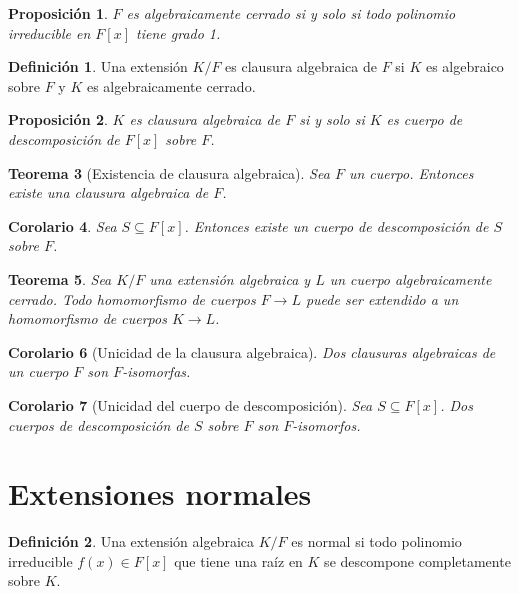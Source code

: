 \documentclass{report}
\newtheorem{theorem}{Teorema}[chapter]
\newtheorem{corollary}[theorem]{Corolario}
\newtheorem{proposition}[theorem]{Proposición}
\theoremstyle{remark}
\theoremstyle{definition}
\newtheorem{definition}{Definición}[chapter]
\theoremstyle{definition}
\theoremstyle{definition}
\begin{document}
\begin{proposition}
    $F$ es algebraicamente cerrado si y solo si todo polinomio irreducible en $F[x]$ tiene grado 1.
\end{proposition}

\begin{definition}
    Una extensión $K/F$ es clausura algebraica de $F$ si $K$ es algebraico sobre $F$ y $K$ es algebraicamente cerrado.
\end{definition}

\begin{proposition}
    $K$ es clausura algebraica de $F$ si y solo si $K$ es cuerpo de descomposición de $F[x]$ sobre $F$.
\end{proposition}

\begin{theorem}[Existencia de clausura algebraica]
    Sea $F$ un cuerpo. Entonces existe una clausura algebraica de $F$.
\end{theorem}

\begin{corollary}
    Sea $S \subseteq F[x]$. Entonces existe un cuerpo de descomposición de $S$ sobre $F$.
\end{corollary}

\begin{theorem}
    Sea $K/F$ una extensión algebraica y $L$ un cuerpo algebraicamente cerrado.
    Todo homomorfismo de cuerpos $F \to L$ puede ser extendido a un homomorfismo de cuerpos $K \to L$.
\end{theorem}

\begin{corollary}[Unicidad de la clausura algebraica]
    Dos clausuras algebraicas de un cuerpo $F$ son $F$-isomorfas.
\end{corollary}

\begin{corollary}[Unicidad del cuerpo de descomposición]
    Sea $S \subseteq F[x]$. Dos cuerpos de descomposición de $S$ sobre $F$ son $F$-isomorfos.
\end{corollary}

\section{Extensiones normales}

\begin{definition}
    Una extensión algebraica $K/F$ es normal si todo polinomio irreducible $f(x) \in F[x]$ que tiene una raíz en $K$ se descompone completamente sobre $K$.
\end{definition}
\end{document}
